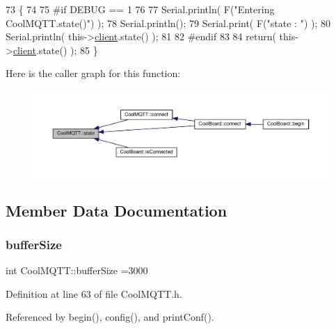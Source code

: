 \begin{DoxyCode}
73 \{
74 
75 \textcolor{preprocessor}{#if DEBUG == 1 }
76 
77     Serial.println( F(\textcolor{stringliteral}{"Entering CoolMQTT.state()"}) );
78     Serial.println();   
79     Serial.print( F(\textcolor{stringliteral}{"state : "}) );
80     Serial.println( this->\hyperlink{classCoolMQTT_a4ca71e4f76ef868692a297efd45b1415}{client}.state() );
81 
82 \textcolor{preprocessor}{#endif}
83     
84     \textcolor{keywordflow}{return}( this->\hyperlink{classCoolMQTT_a4ca71e4f76ef868692a297efd45b1415}{client}.state() );
85 \}
\end{DoxyCode}
Here is the caller graph for this function\+:
\nopagebreak
\begin{figure}[H]
\begin{center}
\leavevmode
\includegraphics[width=350pt]{classCoolMQTT_a5d003307eff78efbd585e42b43b72b6d_icgraph}
\end{center}
\end{figure}


\subsection{Member Data Documentation}
\mbox{\label{classCoolMQTT_a7f3cf26b51d6770f216e42c5ef13ca9f}} 
\subsubsection{\texorpdfstring{buffer\+Size}{bufferSize}}
{\footnotesize\ttfamily int Cool\+M\+Q\+T\+T\+::buffer\+Size =3000\hspace{0.3cm}{\ttfamily [private]}}



Definition at line 63 of file Cool\+M\+Q\+T\+T.\+h.



Referenced by begin(), config(), and print\+Conf().

\mbox{\label{classCoolMQTT_a4ca71e4f76ef868692a297efd45b1415}} 
